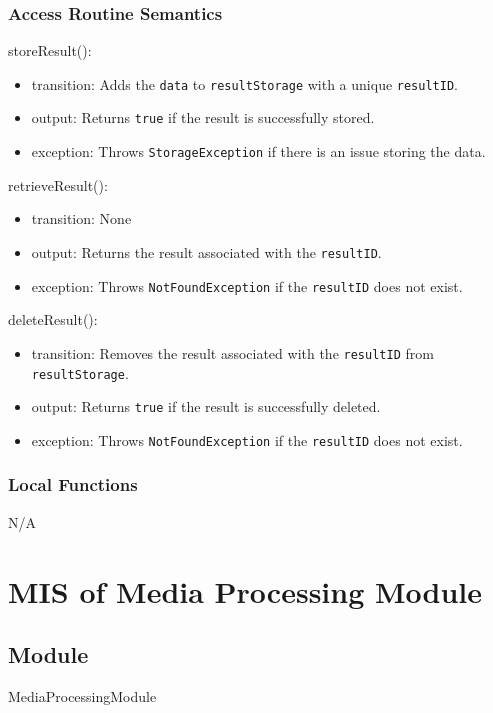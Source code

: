 \documentclass[12pt, titlepage]{article}
\begin{document}
\subsubsection{Access Routine Semantics}

\noindent storeResult():
\begin{itemize}
\item transition: Adds the \texttt{data} to \texttt{resultStorage} with a unique \texttt{resultID}.
\item output: Returns \texttt{true} if the result is successfully stored.
\item exception: Throws \texttt{StorageException} if there is an issue storing the data.
\end{itemize}

\noindent retrieveResult():
\begin{itemize}
\item transition: None
\item output: Returns the result associated with the \texttt{resultID}.
\item exception: Throws \texttt{NotFoundException} if the \texttt{resultID} does not exist.
\end{itemize}

\noindent deleteResult():
\begin{itemize}
\item transition: Removes the result associated with the \texttt{resultID} from \texttt{resultStorage}.
\item output: Returns \texttt{true} if the result is successfully deleted.
\item exception: Throws \texttt{NotFoundException} if the \texttt{resultID} does not exist.
\end{itemize}

\subsubsection{Local Functions}

N/A
\section{MIS of Media Processing Module} \label{MediaProcessingModule}

\subsection{Module}
MediaProcessingModule
\end{document}
